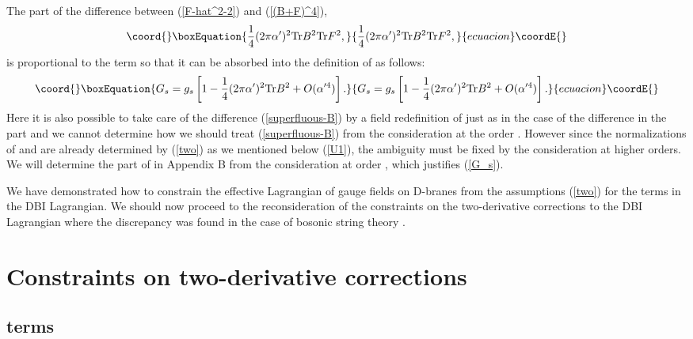 \documentclass[a4paper,12pt]{article}
\begin{document}
The \coordHE{} part of the difference
between (\ref{F-hat^2-2}) and (\ref{(B+F)^4}),
\begin{equation}\coord{}\boxEquation{
\frac{1}{4} (2 \pi \alpha')^2 {\rm Tr} B^2 {\rm Tr} F^2,
\label{superfluous-B}
}{
\frac{1}{4} (2 \pi \alpha')^2 {\rm Tr} B^2 {\rm Tr} F^2,
}{ecuacion}\coordE{}\end{equation}
is proportional to the \coordHE{} term so that
it can be absorbed into the definition of \coordHE{} as follows:
\begin{equation}\coord{}\boxEquation{
G_s
= g_s \left[
1 -\frac{1}{4} (2 \pi \alpha')^2
{\rm Tr} B^2 + O(\alpha'^4)
\right].
\label{G_s}
}{
G_s
= g_s \left[
1 -\frac{1}{4} (2 \pi \alpha')^2
{\rm Tr} B^2 + O(\alpha'^4)
\right].
}{ecuacion}\coordE{}\end{equation}
Here it is also possible to take care of the difference
(\ref{superfluous-B}) by a field redefinition of \coordHE{}
just as in the case of the difference in the \coordHE{} part
and we cannot determine how we should treat
(\ref{superfluous-B}) from the consideration
at the order \coordHE{}.
However since the normalizations of \coordHE{} and \coordHE{}
are already determined by (\ref{two}) as we mentioned
below (\ref{U1}), the ambiguity must be fixed
by the consideration at higher orders.
We will determine the \coordHE{} part of \coordHE{}
in Appendix B from the consideration at order \coordHE{},
which justifies (\ref{G_s}).

We have demonstrated how to constrain the effective Lagrangian
of gauge fields on D-branes from the assumptions (\ref{two})
for the \coordHE{} terms in the DBI Lagrangian.
We should now proceed to the reconsideration
of the constraints on the two-derivative
corrections to the DBI Lagrangian
where the discrepancy was found
in the case of bosonic string theory \cite{Okawa}.

\section{Constraints on two-derivative corrections}
\setcounter{equation}{0}

\subsection{\coordHE{} terms}
\indent
\end{document}
